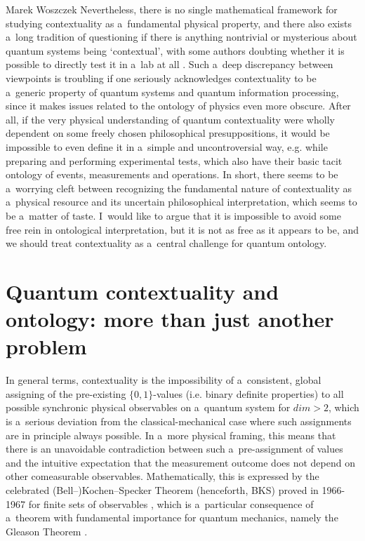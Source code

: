 \begin{artengenv}{Marek Woszczek}
Nevertheless, there is no single mathematical framework for studying contextuality as a~fundamental physical property, and there also exists a~long tradition of questioning if there is anything nontrivial or mysterious about quantum systems being ‘contextual', with some authors doubting whether it is possible to directly test it in a~lab at all
\parencite[see e.g.][]{hermens_problem_2011}. %
 Such a~deep discrepancy between viewpoints is troubling if one seriously acknowledges contextuality to be a~generic property of quantum systems and quantum information processing, since it makes issues related to the ontology of physics even more obscure. After all, if the very physical understanding of quantum contextuality were wholly dependent on some freely chosen philosophical presuppositions, it would be impossible to even define it in a~simple and uncontroversial way, e.g. while preparing and performing experimental tests, which also have their basic tacit ontology of events, measurements and operations. In short, there seems to be a~worrying cleft between recognizing the fundamental nature of contextuality as a~physical resource and its uncertain philosophical interpretation, which seems to be a~matter of taste. I~would like to argue that it is impossible to avoid some free rein in ontological interpretation, but it is not as free as it appears to be, and we should treat contextuality as a~central challenge for quantum ontology.

\section{Quantum contextuality and ontology: more than just another problem}
In general terms, contextuality is the impossibility of a~consistent, global assigning of the pre-existing $\{0,1\}${}-values (i.e. binary definite properties) to all possible synchronic physical observables on a~quantum system for $\mathit{dim}>2$, which is a~serious deviation from the classical-mechanical case where such assignments are in principle always possible. In a~more physical framing, this means that there is an unavoidable contradiction between such a~pre-assignment of values and the intuitive expectation that the measurement outcome does not depend on other comeasurable observables. Mathematically, this is expressed by the celebrated (Bell–)Kochen–Specker Theorem (henceforth, BKS) proved in 1966-1967 for finite sets of observables
\parencite[][]{kochen_problem_1967}, %
 which is a~particular consequence of a~theorem with fundamental importance for quantum mechanics, namely the Gleason Theorem 
\parencite[][]{gleason_measures_1957}.%



\end{artengenv}
